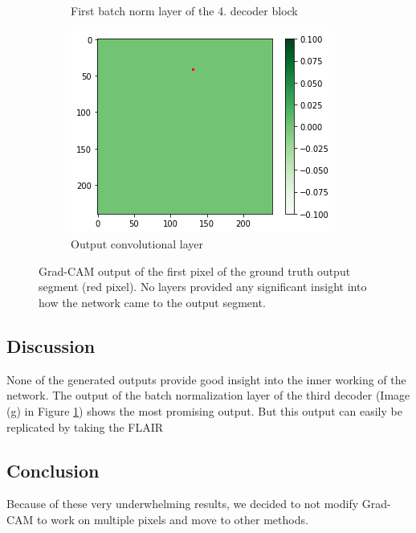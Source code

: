 \begin{figure}[H]
\begin{subfigure}{.33\textwidth}
        \caption{First batch norm layer of the 4. decoder block}
    \end{subfigure}%
        \begin{subfigure}{.33\textwidth}
        \centering
        \includegraphics[width=\linewidth]{chapters/04_segmentation/images/grad_cam_36.png}
        \caption{Output convolutional layer}
    \end{subfigure}
    \caption{Grad-CAM output of the first pixel of the ground truth output segment (red pixel). No layers provided any significant insight into how the network came to the output segment.}
    \label{grad_cam_brats_result}
\end{figure}

\subsection{Discussion}
None of the generated outputs provide good insight into the inner working of the network. The output of the batch normalization layer of the third decoder (Image (g) in Figure \ref{grad_cam_brats_result}) shows the most promising output. But this output can easily be replicated by taking the FLAIR

\subsection{Conclusion}
Because of these very underwhelming results, we decided to not modify Grad-CAM to work on multiple pixels and move to other methods.
